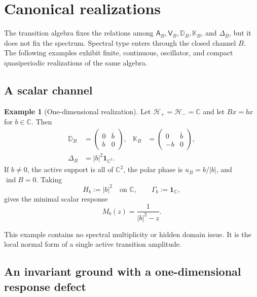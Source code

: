 \documentclass[11pt,reqno]{scrartcl}
\newcommand{\CC}{\mathbb C}
\newcommand{\scrHp}{\mathscr H_{+}}
\newcommand{\scrHm}{\mathscr H_{-}}
\newcommand{\idop}{\mathbf 1}
\newcommand{\Aop}{\mathsf A}
\newcommand{\Vop}{\mathsf V}
\newcommand{\DB}{\mathbb D}
\newcommand{\KB}{\mathbb K}
\newcommand{\DeltaB}{\Delta}
\DeclareMathOperator{\ind}{ind}
\theoremstyle{plain}
\theoremstyle{definition}
\newtheorem{example}[example]{Example}
\theoremstyle{remark}
\begin{document}
\section{Canonical realizations}
\label{sec:examples}

The transition algebra fixes the relations among
\(\Aop_B,\Vop_B,\DB_B,\KB_B\), and \(\DeltaB_B\), but it does not fix the
spectrum.  Spectral type enters through the closed channel \(B\).  The
following examples exhibit finite, continuous, oscillator, and compact
quasiperiodic realizations of the same algebra.

\subsection{A scalar channel}

\begin{example}[One-dimensional realization]
\label{ex:scalar-channel}
Let \(\scrHp=\scrHm=\CC\) and let \(Bx=bx\) for \(b\in\CC\).  Then
\begin{align}
  \DB_B
  &=\begin{pmatrix}0&\overline b\\ b&0\end{pmatrix},
  &
  \KB_B
  &=\begin{pmatrix}0&\overline b\\ -b&0\end{pmatrix},
  \label{eq:scalar-odd-operators}\\
  \DeltaB_B
  &=|b|^2\idop_{\CC^2}.
  \label{eq:scalar-laplacian}
\end{align}
If \(b\ne0\), the active support is all of \(\CC^2\), the polar phase is
\(u_B=b/|b|\), and \(\ind B=0\).  Taking
\begin{equation}
  H_b:=|b|^2\quad\text{on }\CC,
  \qquad
  \Gamma_b:=\idop_\CC,
\end{equation}
gives the minimal scalar response
\begin{equation}
  M_b(z)=\frac{1}{|b|^2-z}.
  \label{eq:scalar-response}
\end{equation}
\end{example}

This example contains no spectral multiplicity or hidden domain issue.  It is
the local normal form of a single active transition amplitude.

\subsection{An invariant ground with a one-dimensional response defect}
\label{sec:three-state-response}
\end{document}
